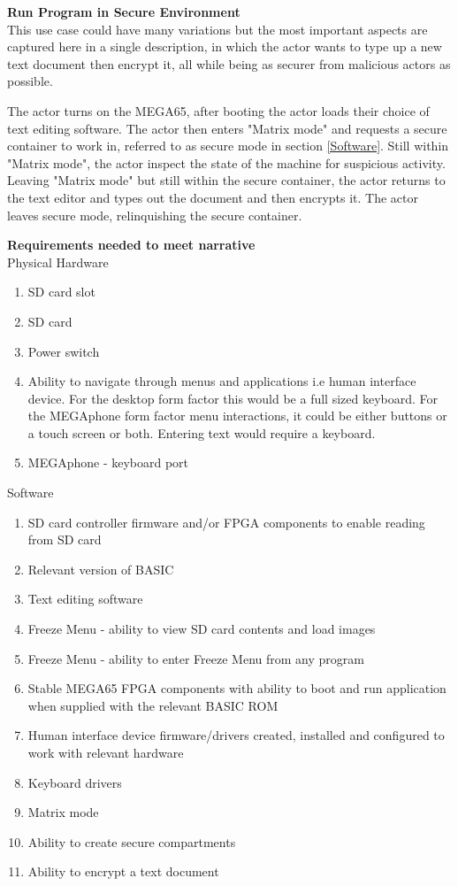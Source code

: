 \textbf{Run Program in Secure Environment}\\
This use case could have many variations but the most important aspects are captured here in a single description, in which the actor wants to type up a new text document then encrypt it, all while being as securer from malicious actors as possible.

The actor turns on the MEGA65, after booting the actor loads their choice of text editing software. The actor then enters "Matrix mode" and requests a secure container to work in, referred to as secure mode in section \ref{Software}. Still within "Matrix mode", the actor inspect the state of the machine for suspicious activity. Leaving "Matrix mode" but still within the secure container, the actor returns to the text editor and types out the document and then encrypts it. The actor leaves secure mode, relinquishing the secure container.

\textbf{Requirements needed to meet narrative}\\
Physical Hardware
\begin{enumerate}
\item SD card slot
\item SD card
\item Power switch
\item Ability to navigate through menus and applications i.e human interface device. For the desktop form factor this would be a full sized keyboard. For the MEGAphone form factor menu interactions, it could be either buttons or a touch screen or both. Entering text would require a keyboard.
\item MEGAphone - keyboard port
\end{enumerate}

Software\\
\begin{enumerate}
\item SD card controller firmware and/or FPGA components to enable reading from SD card
\item Relevant version of BASIC 
\item Text editing software
\item Freeze Menu - ability to view SD card contents and load images
\item Freeze Menu - ability to enter Freeze Menu from any program
\item Stable MEGA65 FPGA components with ability to boot and run application when supplied with the relevant BASIC ROM
\item Human interface device firmware/drivers created, installed and configured to work with relevant hardware
\item Keyboard drivers
\item Matrix mode
\item Ability to create secure compartments
\item Ability to encrypt a text document
\end{enumerate}


